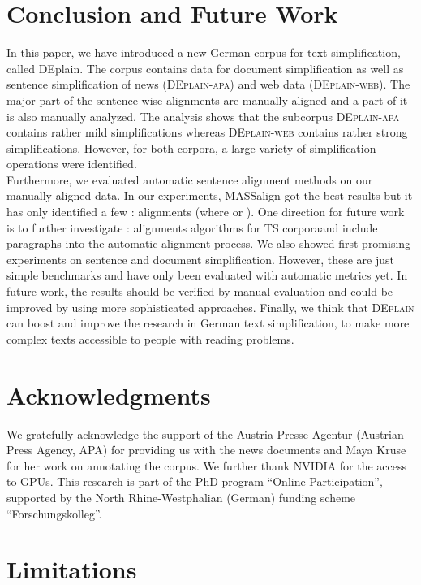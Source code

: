 \documentclass[11pt]{article}
\begin{document}
\section{Conclusion and Future Work}
In this paper, we have introduced a new German corpus for text simplification, 
called DEplain. The corpus contains data for document simplification as well as sentence simplification of news (\textsc{DEplain-apa}) and web data (\textsc{DEplain-web}). 
The major part of the sentence-wise alignments are manually aligned and a part of it is also manually analyzed. The analysis shows that the subcorpus \textsc{DEplain-apa} contains rather mild simplifications whereas \textsc{DEplain-web} contains rather strong simplifications. However, for both corpora, a large variety of simplification operations were identified. \\
Furthermore, we evaluated automatic sentence alignment methods on our manually aligned data. In our experiments, MASSalign got the best results but it has only identified a few : alignments (where  or ). One direction for future work is to further investigate : alignments algorithms for TS corporaand include paragraphs into the automatic alignment process. We also showed first promising experiments on sentence and document simplification. However, these are just simple benchmarks and have only been evaluated with automatic metrics yet. In future work, the results should be verified by manual evaluation and could be improved by 
using more sophisticated approaches.
Finally, we think that \textsc{DEplain} can boost and improve the research in German text simplification, to make more complex texts accessible to people with reading problems.

\newpage



\section*{Acknowledgments}
We gratefully acknowledge  the support of the Austria Presse Agentur (Austrian Press Agency, APA) for providing us with the news documents and Maya Kruse for her work on annotating the corpus. We further thank  NVIDIA for the access to GPUs. This research is part of the PhD-program ``Online Participation'', supported by the North Rhine-Westphalian (German) funding scheme ``Forschungskolleg''.


\section*{Limitations }
\end{document}
